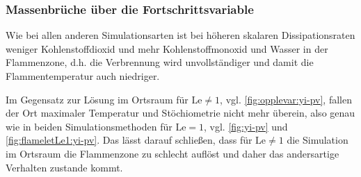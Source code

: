 %


\subsubsection{Massenbrüche über die Fortschrittsvariable}

Wie bei allen anderen Simulationsarten ist bei höheren skalaren Dissipationsraten weniger Kohlenstoffdioxid und mehr Kohlenstoffmonoxid und Wasser in der Flammenzone, d.h. die Verbrennung wird unvollständiger und damit die Flammentemperatur auch niedriger.

Im Gegensatz zur Lösung im Ortsraum für $\mathrm{Le}\neq 1$, vgl. \autoref{fig:opplevar:yi-pv}, fallen der Ort maximaler Temperatur und Stöchiometrie nicht mehr überein, also genau wie in beiden Simulationsmethoden für $\mathrm{Le}=1$, vgl. \autoref{fig:yi-pv} und \ref{fig:flameletLe1:yi-pv}. Das lässt darauf schließen, dass für $\mathrm{Le}\neq 1$ die Simulation im Ortsraum die Flammenzone zu schlecht auflöst und daher das andersartige Verhalten zustande kommt.

